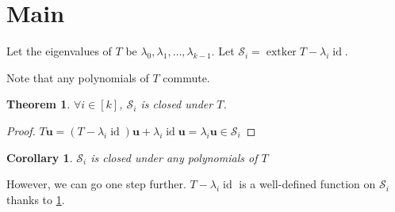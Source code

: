 \documentclass{article}
\theoremstyle{plain}
\newtheorem{theorem}{Theorem}[section]
\newtheorem{lemma}[theorem]{Lemma}
\newtheorem{corollary}{Corollary}[theorem]
\theoremstyle{definition}
\newcommand{\0}{\mathbf{0}}
\renewcommand{\vec}{\mathbf}
\newcommand{\N}{\mathbb{N}}
\newcommand{\vecspace}[1]{\mathcal{#1}}
\DeclareMathOperator{\extker}{extker}
\DeclareMathOperator{\id}{id}
\begin{document}
\section{Main}

Let the eigenvalues of $T$ be $\lambda_0, \lambda_1, \dots, \lambda_{k-1}$. Let $\vecspace{S}_i=\extker T-\lambda_i\id$.

Note that any polynomials of $T$ commute.


\begin{theorem}
    \label{theorem:closed_under_T}
    $\forall i\in[k]$, $\vecspace{S}_i$ is closed under $T$.
\end{theorem}
\begin{proof}
    $T\vec{u}=(T-\lambda_i\id)\vec{u} + \lambda_i\id\vec{u}=\lambda_i\vec{u}\in\vecspace{S}_i$
\end{proof}

\begin{corollary}
    \label{corollary:closed_under_p_T}
    $\vecspace{S}_i$ is closed under any polynomials of $T$
\end{corollary}

However, we can go one step further.
$T-\lambda_i\id$ is a well-defined function on $\vecspace{S}_i$ thanks to \ref{corollary:closed_under_p_T}.
\end{document}
